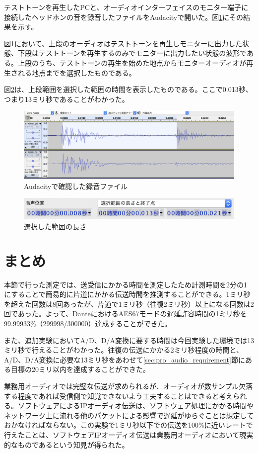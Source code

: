 テストトーンを再生したPCと、オーディオインターフェイスのモニター端子に接続したヘッドホンの音を録音したファイルをAudacityで開いた。図\ref{fig:advance_test_monitor}にその結果を示す。

図\ref{fig:advance_test_monitor}において、上段のオーディオはテストトーンを再生しモニターに出力した状態、下段はテストトーンを再生するのみでモニターに出力したい状態の波形である。上段のうち、テストトーンの再生を始めた地点からモニターオーディオが再生される地点までを選択したものである。

図\ref{fig:advance_test_monitor_length}は、上段範囲を選択した範囲の時間を表示したものである。ここで0.013秒、つまり13ミリ秒であることがわかった。

\begin{figure}[tbp]
  \centering
  \includegraphics[width=\linewidth]{img/advance_test_monitor.png}
  \caption{Audacityで確認した録音ファイル}
  \label{fig:advance_test_monitor}
\end{figure}

\begin{figure}[tbp]
  \centering
  \includegraphics[width=\linewidth]{img/advance_test_monitor_length.png}
  \caption{選択した範囲の長さ}
  \label{fig:advance_test_monitor_length}
\end{figure}

\section{まとめ}

本節で行った測定では、送受信にかかる時間を測定したため計測時間を2分の1にすることで簡易的に片道にかかる伝送時間を推測することができる。1ミリ秒を超えた回数は8回あったが、片道で1ミリ秒（往復2ミリ秒）以上になる回数は2回であった。よって、DanteにおけるAES67モードの遅延許容時間の1ミリ秒を99.99933\%（299998/300000）達成することができた。

また、追加実験においてA/D、D/A変換に要する時間は今回実験した環境では13ミリ秒で行えることがわかった。往復の伝送にかかる2ミリ秒程度の時間と、A/D、D/A変換に必要な13ミリ秒をあわせて\ref{sec:pro_audio_requirement}節にある目標の20ミリ以内を達成することができた。

業務用オーディオでは完璧な伝送が求められるが、オーディオが数サンプル欠落する程度であれば受信側で知覚できないよう工夫することはできると考えられる。ソフトウェアによるIPオーディオ伝送は、ソフトウェア処理にかかる時間やネットワーク上に流れる他のパケットによる影響で遅延がゆらぐことは想定しておかなければならない。この実験で1ミリ秒以下での伝送を100\%に近いレートで行えたことは、ソフトウェアIPオーディオ伝送は業務用オーディオにおいて現実的なものであるという知見が得られた。

